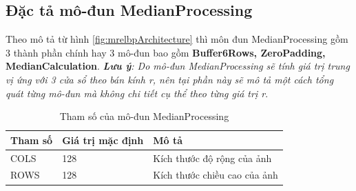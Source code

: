 \subsection{Đặc tả mô-đun MedianProcessing}
Theo mô tả từ hình \ref{fig:mrelbpArchitecture} thì môn đun MedianProcessing gồm 3 thành phần chính hay 3 mô-đun bao gồm \textbf{Buffer6Rows, ZeroPadding, MedianCalculation}. \textit{\textbf{Lưu ý}: Do mô-đun MedianProcessing sẽ tính giá trị trung vị ứng với 3 cửa sổ theo bán kính r, nên tại phần này sẽ mô tả một cách tổng quát từng mô-đun mà không chi tiết cụ thể theo từng giá trị r}.
\begin{table}[!ht]
    \centering
    \renewcommand{\arraystretch}{1.3} %
        \caption{Tham số của mô-đun MedianProcessing}
    \begin{tabular}{|p{3cm} p{4cm} p{8cm}|}
        \hline
        \rowcolor{gray!30}
        \textbf{Tham số } & \textbf{Giá trị mặc định}  & \textbf{Mô tả} \\
        \hline
        COLS & 128 & Kích thước độ rộng của ảnh
        \\ \hline
        ROWS & 128 & Kích thước chiều cao của ảnh
        \\
        \hline
    \end{tabular}

    \label{tab:paramListMedianProcessing}
\end{table}

